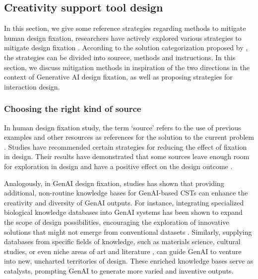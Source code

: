 \subsection{Creativity support tool design}
In this section, we give some reference strategies regarding methods to mitigate human design fixation, researchers have actively explored various strategies to mitigate design fixation \cite{linsey2010study}. According to the solution categorization proposed by \cite{alipour2018review}, the strategies can be divided into sourece, methods and instructions. In this section, we discuss mitigation methods in inspiration of the two directions in the context of Generative AI design fixation, as well as proposing strategies for interaction design. 

\subsubsection{Choosing the right kind of source}
In human design fixation study, the term ‘source’ refers to the use of previous examples and other resources as references for the solution to the current problem \cite{cai2010extended}. Studies have recommended certain strategies for reducing the effect of fixation in design. Their results have demonstrated that some sources leave enough room for exploration in design \cite{cheng2014new} and have a positive effect on the design outcome \cite{goldschmidt2011avoiding}. 

Analogously, in GenAI design fixation, studies has shown that providing additional, non-routine knowledge bases for GenAI-based CSTs can enhance the creativity and diversity of GenAI outputs. For instance, integrating specialized biological knowledge databases into GenAI systems \cite{zhu2023biologically} has been shown to expand the scope of design possibilities, encouraging the exploration of innovative solutions that might not emerge from conventional datasets \cite{kang2024biospark}. Similarly, supplying databases from specific fields of knowledge, such as materials science, cultural studies, or even niche areas of art and literature \cite{wang2024promptcharm}, can guide GenAI to venture into new, uncharted territories of design. These enriched knowledge bases serve as catalysts, prompting GenAI to generate more varied and inventive outputs.

